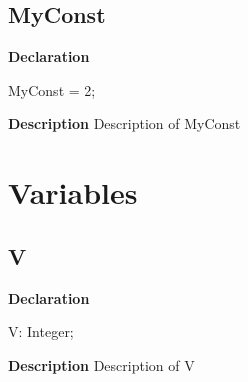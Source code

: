 \documentclass{report}
\newif\ifpdf
\begin{document}
\subsection*{MyConst}
\fi
\label{ok_back_comment-MyConst}
\begin{list}{}{
\setlength{\itemindent}{0cm}
\setlength{\listparindent}{0cm}
\setlength{\leftmargin}{\evensidemargin}
\addtolength{\leftmargin}{\tmplength}
\settowidth{\labelsep}{X}
\addtolength{\leftmargin}{\labelsep}
\setlength{\labelwidth}{\tmplength}
}
\item[\textbf{Declaration}\hfill]
\ifpdf
\begin{flushleft}
\fi
\begin{ttfamily}
MyConst = 2;\end{ttfamily}

\ifpdf
\end{flushleft}
\fi

\par
\item[\textbf{Description}]
Description of MyConst

\end{list}
\section{Variables}
\ifpdf
\subsection*{\large{\textbf{V}}\normalsize\hspace{1ex}\hrulefill}
\else
\subsection*{V}
\fi
\label{ok_back_comment-V}
\begin{list}{}{
\setlength{\itemindent}{0cm}
\setlength{\listparindent}{0cm}
\setlength{\leftmargin}{\evensidemargin}
\addtolength{\leftmargin}{\tmplength}
\settowidth{\labelsep}{X}
\addtolength{\leftmargin}{\labelsep}
\setlength{\labelwidth}{\tmplength}
}
\item[\textbf{Declaration}\hfill]
\ifpdf
\begin{flushleft}
\fi
\begin{ttfamily}
V: Integer;\end{ttfamily}

\ifpdf
\end{flushleft}
\fi

\par
\item[\textbf{Description}]
Description of V

\end{list}
\ifpdf
\end{document}
